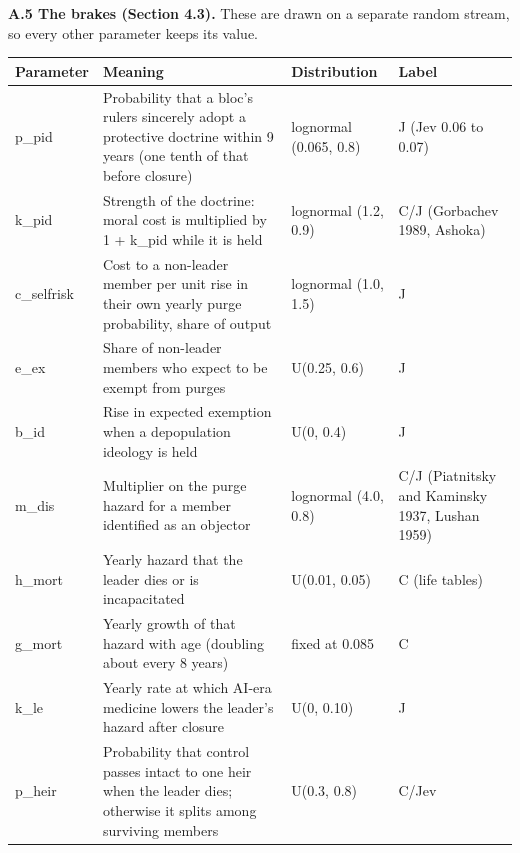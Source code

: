 \documentclass[
  10pt,
]{article}
\newcounter{none} %
\begin{document}
\textbf{A.5 The brakes (Section 4.3).} These are drawn on a separate random stream, so every other
parameter keeps its value.

{\def\LTcaptype{none} %
\begin{longtable}[]{@{}
  >{\raggedright\arraybackslash}p{}
  >{\raggedright\arraybackslash}p{}
  >{\raggedright\arraybackslash}p{}
  >{\raggedright\arraybackslash}p{}@{}}
\toprule\noalign{}
\begin{minipage}[b]{\linewidth}\raggedright
Parameter
\end{minipage} & \begin{minipage}[b]{\linewidth}\raggedright
Meaning
\end{minipage} & \begin{minipage}[b]{\linewidth}\raggedright
Distribution
\end{minipage} & \begin{minipage}[b]{\linewidth}\raggedright
Label
\end{minipage} \\
\midrule\noalign{}
\endhead
\bottomrule\noalign{}
\endlastfoot
p\_pid & Probability that a bloc's rulers sincerely adopt a protective doctrine within 9 years (one
tenth of that before closure) & lognormal (0.065, 0.8) & J (Jev 0.06 to 0.07) \\
k\_pid & Strength of the doctrine: moral cost is multiplied by 1 + k\_pid while it is held &
lognormal (1.2, 0.9) & C/J (Gorbachev 1989, Ashoka) \\
c\_selfrisk & Cost to a non-leader member per unit rise in their own yearly purge probability, share
of output & lognormal (1.0, 1.5) & J \\
e\_ex & Share of non-leader members who expect to be exempt from purges & U(0.25, 0.6) & J \\
b\_id & Rise in expected exemption when a depopulation ideology is held & U(0, 0.4) & J \\
m\_dis & Multiplier on the purge hazard for a member identified as an objector & lognormal (4.0,
0.8) & C/J (Piatnitsky and Kaminsky 1937, Lushan 1959) \\
h\_mort & Yearly hazard that the leader dies or is incapacitated & U(0.01, 0.05) & C (life
tables) \\
g\_mort & Yearly growth of that hazard with age (doubling about every 8 years) & fixed at 0.085 &
C \\
k\_le & Yearly rate at which AI-era medicine lowers the leader's hazard after closure & U(0, 0.10) &
J \\
p\_heir & Probability that control passes intact to one heir when the leader dies; otherwise it
splits among surviving members & U(0.3, 0.8) & C/Jev \\
\end{longtable}
}
\end{document}
